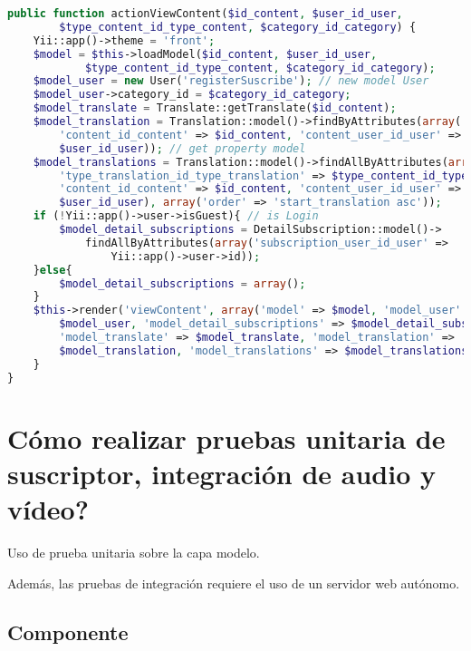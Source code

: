 \begin{itemize}
\begin{enumerate}
\begin{lstlisting}[language = PHP, caption={Acción de obtención y envió para vista podcast.}]
public function actionViewContent($id_content, $user_id_user, 
        $type_content_id_type_content, $category_id_category) {
    Yii::app()->theme = 'front';
    $model = $this->loadModel($id_content, $user_id_user, 
            $type_content_id_type_content, $category_id_category);
    $model_user = new User('registerSuscribe'); // new model User
    $model_user->category_id = $category_id_category;
    $model_translate = Translate::getTranslate($id_content);
    $model_translation = Translation::model()->findByAttributes(array(
        'content_id_content' => $id_content, 'content_user_id_user' => 
        $user_id_user)); // get property model
    $model_translations = Translation::model()->findAllByAttributes(array(
        'type_translation_id_type_translation' => $type_content_id_type_content,
        'content_id_content' => $id_content, 'content_user_id_user' => 
        $user_id_user), array('order' => 'start_translation asc'));
    if (!Yii::app()->user->isGuest){ // is Login
        $model_detail_subscriptions = DetailSubscription::model()->
            findAllByAttributes(array('subscription_user_id_user' => 
                Yii::app()->user->id));
    }else{
        $model_detail_subscriptions = array();
    }
    $this->render('viewContent', array('model' => $model, 'model_user' => 
        $model_user, 'model_detail_subscriptions' => $model_detail_subscriptions, 
        'model_translate' => $model_translate, 'model_translation' => 
        $model_translation, 'model_translations' => $model_translations));
    }
}
\end{lstlisting}

\end{enumerate}

\end{itemize}

\section{\textquestiondown Cómo realizar pruebas unitaria de suscriptor, integración de audio y vídeo?}

Uso de prueba unitaria sobre la capa modelo.

Además, las pruebas de integración requiere el uso de un servidor web autónomo. 

\subsection{Componente}

